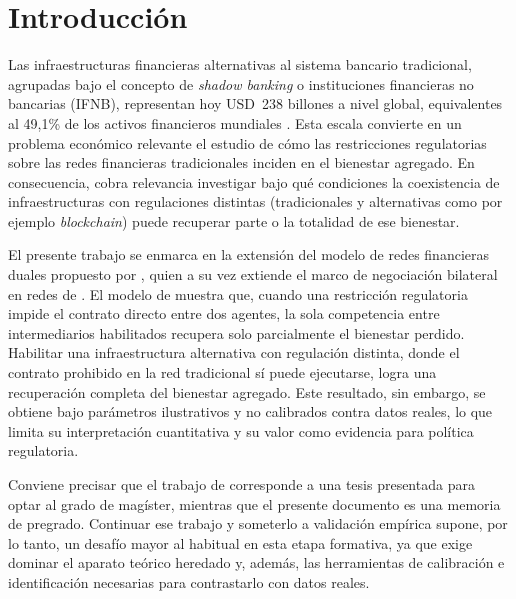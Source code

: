 
\chapter{Introducción}
\label{c1} %


Las infraestructuras financieras alternativas al sistema bancario tradicional, agrupadas bajo el concepto de \textit{shadow banking} o instituciones financieras no bancarias (IFNB), representan hoy USD~238 billones a nivel global, equivalentes al 49,1\% de los activos financieros mundiales \cite{fsb_global_2024}. Esta escala convierte en un problema económico relevante el estudio de cómo las restricciones regulatorias sobre las redes financieras tradicionales inciden en el bienestar agregado. En consecuencia, cobra relevancia investigar bajo qué condiciones la coexistencia de infraestructuras con regulaciones distintas (tradicionales y alternativas como por ejemplo \textit{blockchain}) puede recuperar parte o la totalidad de ese bienestar.

El presente trabajo se enmarca en la extensión del modelo de redes financieras duales propuesto por , quien a su vez extiende el marco de negociación bilateral en redes de . El modelo de  muestra que, cuando una restricción regulatoria impide el contrato directo entre dos agentes, la sola competencia entre intermediarios habilitados recupera solo parcialmente el bienestar perdido. Habilitar una infraestructura alternativa con regulación distinta, donde el contrato prohibido en la red tradicional sí puede ejecutarse, logra una recuperación completa del bienestar agregado. Este resultado, sin embargo, se obtiene bajo parámetros ilustrativos y no calibrados contra datos reales, lo que limita su interpretación cuantitativa y su valor como evidencia para política regulatoria.

Conviene precisar que el trabajo de  corresponde a una tesis presentada para optar al grado de magíster, mientras que el presente documento es una memoria de pregrado. Continuar ese trabajo y someterlo a validación empírica supone, por lo tanto, un desafío mayor al habitual en esta etapa formativa, ya que exige dominar el aparato teórico heredado y, además, las herramientas de calibración e identificación necesarias para contrastarlo con datos reales.

